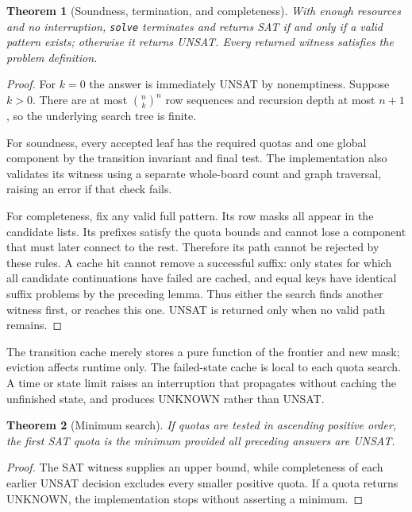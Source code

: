 \documentclass[11pt,a4paper]{article}
\newtheorem{theorem}{Theorem}
\begin{document}
\begin{theorem}[Soundness, termination, and completeness]
With enough resources and no interruption, \texttt{solve} terminates and
returns SAT if and only if a valid pattern exists; otherwise it returns UNSAT.
Every returned witness satisfies the problem definition.
\end{theorem}
\begin{proof}
For $k=0$ the answer is immediately UNSAT by nonemptiness. Suppose $k>0$.
There are at most $\binom{n}{k}^{n}$ row sequences and recursion depth at
most $n+1$, so the underlying search tree is finite.

For soundness, every accepted leaf has the required quotas and one global
component by the transition invariant and final test. The implementation
also validates its witness using a separate whole-board count and graph
traversal, raising an error if that check fails.

For completeness, fix any valid full pattern. Its row masks all appear in
the candidate lists. Its prefixes satisfy the quota bounds and cannot lose
a component that must later connect to the rest. Therefore its path cannot
be rejected by these rules. A cache hit cannot remove a successful suffix:
only states for which all candidate continuations have failed are cached,
and equal keys have identical suffix problems by the preceding lemma.
Thus either the search finds another witness first, or reaches this one.
UNSAT is returned only when no valid path remains.
\end{proof}

The transition cache merely stores a pure function of the frontier and new
mask; eviction affects runtime only. The failed-state cache is local to each
quota search. A time or state limit raises an interruption that propagates
without caching the unfinished state, and produces UNKNOWN rather than UNSAT.

\begin{theorem}[Minimum search]
If quotas are tested in ascending positive order, the first SAT quota is
the minimum provided all preceding answers are UNSAT.
\end{theorem}
\begin{proof}
The SAT witness supplies an upper bound, while completeness of each earlier
UNSAT decision excludes every smaller positive quota. If a quota returns
UNKNOWN, the implementation stops without asserting a minimum.
\end{proof}

\clearpage
\end{document}
